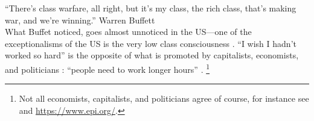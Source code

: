 \documentclass[10pt, letterpaper]{article}
\begin{document}
\begin{spacing}{1.8}
``There's class warfare, all right, but it's my class, the rich class, that's making war, and we're winning.'' Warren Buffett\\

What Buffet noticed, goes almost unnoticed in the US---one of the exceptionalisms of the US is the very low class consciousness \citep{lipset97, lipset00}.
%
%
``I wish I hadn't worked so hard''  is the opposite of  what is promoted by
capitalists, economists, and politicians \citep{wang11b,wight2005adam}: ``people need to work longer hours'' %
\citep{smithABC15jul8}. \footnote{Not all economists, capitalists, and politicians agree of course,
  for instance see \citet{wight2005adam} and \url{https://www.epi.org/}.}




\end{spacing}
\end{document}
